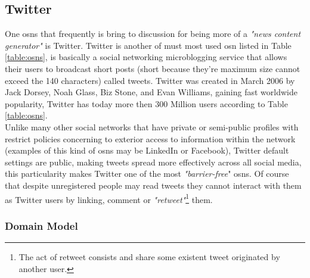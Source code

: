 \subsection{Twitter}
One \glspl{osn} that frequently is bring to discussion for being more of a \textit{"news content generator"} is Twitter. Twitter is another of must most used \gls{osn}
listed in Table \ref{table:osns}, is basically a social networking microblogging service that allows their users to broadcast short posts (short because they're maximum size cannot exceed the 140 characters) called tweets.
Twitter was created in March 2006 by Jack Dorsey, Noah Glass, Biz Stone, and Evan Williams, gaining fast worldwide popularity, Twitter has today more then 300 Million users according to Table \ref{table:osns}.\\

\indent Unlike many other social networks that have private or semi-public profiles with restrict policies concerning to exterior access to information within the network (examples of this kind of \glspl{osn} may be LinkedIn or Facebook),
Twitter default settings are public, making tweets spread more effectively across all social media, this particularity makes Twitter one of the most \textit{"barrier-free}" \glspl{osn}. Of course that despite unregistered people may read tweets
they cannot interact with them as Twitter users by linking, comment or \textit{"retweet"}\footnote{The act of retweet consists and share some existent tweet originated by another user.} them.

\clearpage

\subsubsection*{Domain Model}

